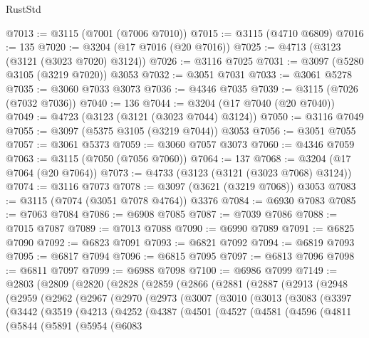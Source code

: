 \begin{lexlean}{RustStd}
\begin{coremodule}
{\begin{coremodule}
{{{{{{{{{{{{{{{{{{{{{{{{{{{{{{{{@7013 := @3115 (@7001 (@7006 @7010))
@7015 := @3115 (@4710 @6809)
@7016 := 135
@7020 := @3204 (@17 @7016 (@20 @7016))
@7025 := @4713 (@3123 (@3121 (@3023 @7020) @3124))
@7026 := @3116 @7025
@7031 := @3097 (@5280 @3105 (@3219 @7020)) @3053
@7032 := @3051 @7031
@7033 := @3061 @5278
@7035 := @3060 @7033 @3073
@7036 := @4346 @7035
@7039 := @3115 (@7026 (@7032 @7036))
@7040 := 136
@7044 := @3204 (@17 @7040 (@20 @7040))
@7049 := @4723 (@3123 (@3121 (@3023 @7044) @3124))
@7050 := @3116 @7049
@7055 := @3097 (@5375 @3105 (@3219 @7044)) @3053
@7056 := @3051 @7055
@7057 := @3061 @5373
@7059 := @3060 @7057 @3073
@7060 := @4346 @7059
@7063 := @3115 (@7050 (@7056 @7060))
@7064 := 137
@7068 := @3204 (@17 @7064 (@20 @7064))
@7073 := @4733 (@3123 (@3121 (@3023 @7068) @3124))
@7074 := @3116 @7073
@7078 := @3097 (@3621 (@3219 @7068)) @3053
@7083 := @3115 (@7074 (@3051 @7078 @4764)) @3376
@7084 := @6930 @7083
@7085 := @7063 @7084
@7086 := @6908 @7085
@7087 := @7039 @7086
@7088 := @7015 @7087
@7089 := @7013 @7088
@7090 := @6990 @7089
@7091 := @6825 @7090
@7092 := @6823 @7091
@7093 := @6821 @7092
@7094 := @6819 @7093
@7095 := @6817 @7094
@7096 := @6815 @7095
@7097 := @6813 @7096
@7098 := @6811 @7097
@7099 := @6988 @7098
@7100 := @6986 @7099
@7149 := @2803
    (@2809
      (@2820
        (@2828
          (@2859
            (@2866
              (@2881
                (@2887
                  (@2913
                    (@2948
                      (@2959
                        (@2962
                          (@2967
                            (@2970
                              (@2973
                                (@3007
                                  (@3010
                                    (@3013
                                      (@3083
                                        (@3397
                                          (@3442
                                            (@3519
                                              (@4213
                                                (@4252
                                                  (@4387
                                                    (@4501
                                                      (@4527
                                                        (@4581
                                                          (@4596
                                                            (@4811
                                                              (@5844
                                                                (@5891
                                                                  (@5954
                                                                    (@6083
}}}}}}}}}}}}}}}}}}}}}}}}}}}}}}}}
\end{coremodule}}
\end{coremodule}
\end{lexlean}
